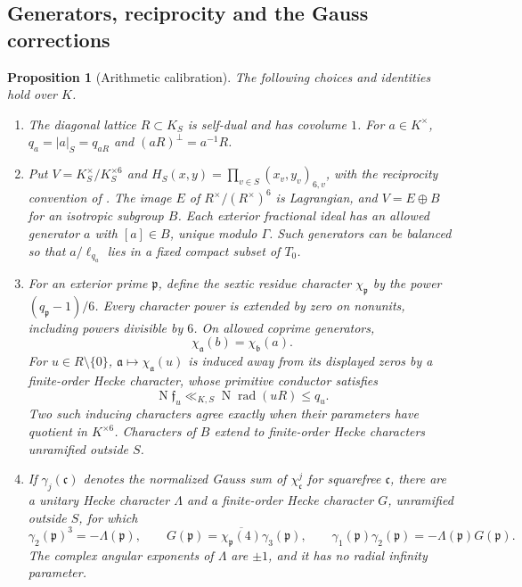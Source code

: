 \documentclass[11pt,a4paper]{article}
\numberwithin{equation}{section}
\newtheorem{proposition}[theorem]{Proposition}
\theoremstyle{definition}
\theoremstyle{remark}
\begin{document}
\subsection{Generators, reciprocity and the Gauss corrections}

\begin{proposition}[Arithmetic calibration]\label{prop:arithmetic-calibration}
The following choices and identities hold over $K$.
\begin{enumerate}[label=\textup{(\roman*)}]
\item The diagonal lattice $R\subset K_S$ is self-dual and has covolume
$1$.  For $a\in K^\times$, $q_a=|a|_S=q_{aR}$ and
$(aR)^\perp=a^{-1}R$.
\item Put $V=K_S^\times/K_S^{\times6}$ and
$H_S(x,y)=\prod_{v\in S}(x_v,y_v)_{6,v}$, with the reciprocity convention
of \cite[Section~3]{P}.  The image $E$ of $R^\times/(R^\times)^6$ is
Lagrangian, and $V=E\oplus B$ for an isotropic subgroup $B$.
Each exterior fractional ideal has an allowed generator $a$ with
$[a]\in B$, unique modulo $\Gamma$.  Such generators can be balanced so
that $a/\ell_{q_a}$ lies in a fixed compact subset of $T_0$.
\item For an exterior prime $\mathfrak p$, define the sextic residue
character $\chi_{\mathfrak p}$ by the power $(q_{\mathfrak p}-1)/6$.
Every character power is extended by zero on nonunits, including powers
divisible by $6$.  On allowed coprime generators,
\begin{equation}\label{eq:allowed-reciprocity}
 \chi_{\mathfrak a}(b)=\chi_{\mathfrak b}(a).
\end{equation}
For $u\in R\setminus\{0\}$, $\mathfrak a\mapsto\chi_{\mathfrak a}(u)$ is
induced away from its displayed zeros by a finite-order Hecke character,
whose primitive conductor satisfies
\begin{equation}\label{eq:kummer-conductor}
 \operatorname N\mathfrak f_u\ll_{K,S}
       \operatorname N\operatorname{rad}(uR)\le q_u.
\end{equation}
Two such inducing characters agree exactly when their parameters have
quotient in $K^{\times6}$.  Characters of $B$ extend to finite-order
Hecke characters unramified outside $S$.
\item If $\gamma_j(\mathfrak c)$ denotes the normalized Gauss sum of
$\chi_{\mathfrak c}^j$ for squarefree $\mathfrak c$, there are a unitary
Hecke character $\Lambda$ and a finite-order Hecke character $G$,
unramified outside $S$, for which
\begin{equation}\label{eq:gauss-calibration}
 \gamma_2(\mathfrak p)^3=-\Lambda(\mathfrak p),\qquad
 G(\mathfrak p)=\overline{\chi_{\mathfrak p}(4)}\gamma_3(\mathfrak p),
 \qquad \gamma_1(\mathfrak p)\gamma_2(\mathfrak p)
       =-\Lambda(\mathfrak p)G(\mathfrak p).
\end{equation}
The complex angular exponents of $\Lambda$ are $\pm1$, and it has no
radial infinity parameter.
\end{enumerate}
\end{proposition}
\end{document}

